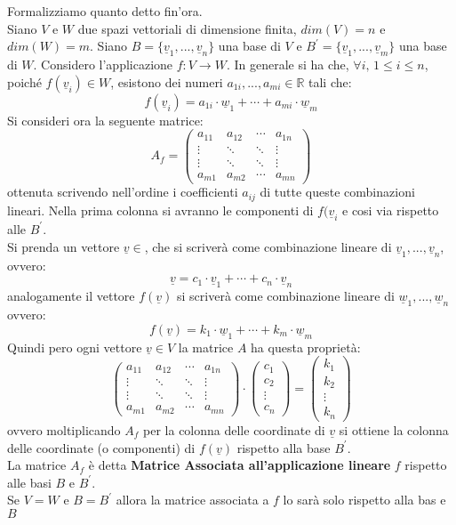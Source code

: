 \documentclass[a4paper,12pt, oneside]{book}
\begin{document}
\begin{definizione}
	Formalizziamo quanto detto fin'ora.\\
	Siano $V$ e $W$ due spazi vettoriali di dimensione finita, $dim (V)=n$ e $dim(W)=m$. Siano $B=\{\underline{v}_1,...,\underline{v}_n\}$ una base di $V$ e $B^{'}=\{\underline{v}_1,...,\underline{v}_m\}$ una base di $W$. Considero l'applicazione $f:V\to W$. In generale si ha che, $\forall i,\, 1\leq i\leq n$, poiché $f(\underline{v}_i)\in W$, esistono dei numeri $a_{1i},...,a_{mi}\in \mathbb{R}$ tali che:
	$$f(\underline{v}_i)=a_{1i}\cdot \underline{w}_1+\cdots+a_{mi}\cdot \underline{w}_m$$
	Si consideri ora la seguente matrice:
	$$
		A_f=\left(\begin{matrix}
				a_{11} & a_{12} & \cdots & a_{1n} \\
				\vdots & \ddots & \ddots & \vdots \\
				\vdots & \ddots & \ddots & \vdots \\
				a_{m1} & a_{m2} & \cdots & a_{mn}
			\end{matrix}\right)
	$$
	ottenuta scrivendo nell'ordine i coefficienti $a_{ij}$ di tutte queste combinazioni lineari. Nella prima colonna si avranno le componenti di $f(\underline{v}_i$ e cosi via rispetto alle $B^{'}$.\\
	Si prenda un vettore $\underline{v}\in $, che si scriverà come combinazione lineare di $\underline{v}_1,...,\underline{v}_n $, ovvero:
	$$\underline{v}=c_1\cdot \underline{v}_1+\cdots +c_n\cdot\underline{v}_n$$
	analogamente il vettore $f(\underline{v})$ si scriverà come combinazione lineare di $\underline{w}_1,...,\underline{w}_n $ ovvero:
	$$f(\underline{v})=k_1\cdot \underline{w}_1+\cdots+k_m\cdot \underline{w}_m$$
	Quindi pero ogni vettore $\underline{v}\in V$ la matrice $A$ ha questa proprietà:
	$$
		\left(\begin{matrix}
				a_{11} & a_{12} & \cdots & a_{1n} \\
				\vdots & \ddots & \ddots & \vdots \\
				\vdots & \ddots & \ddots & \vdots \\
				a_{m1} & a_{m2} & \cdots & a_{mn}
			\end{matrix}\right)\cdot\left(\begin{matrix}
				c_1    \\
				c_2    \\
				\vdots \\
				c_n
			\end{matrix}\right)=\left(\begin{matrix}
				k_1    \\
				k_2    \\
				\vdots \\
				k_n
			\end{matrix}\right)
	$$
	ovvero moltiplicando $A_f$ per la colonna delle coordinate di $\underline{v}$ si ottiene la colonna delle coordinate (o componenti) di $f(\underline{v})$ rispetto alla base $B^{'}$. \\
	La matrice $A_f$ è detta \textbf{Matrice Associata all'applicazione lineare} $f$ rispetto alle basi $B$ e $B^{'}$.\\
	Se $V=W $ e $B=B^{'}$ allora la matrice associata a $f$ lo sarà solo rispetto alla bas e $B$
\end{definizione}
\newpage
\end{document}
